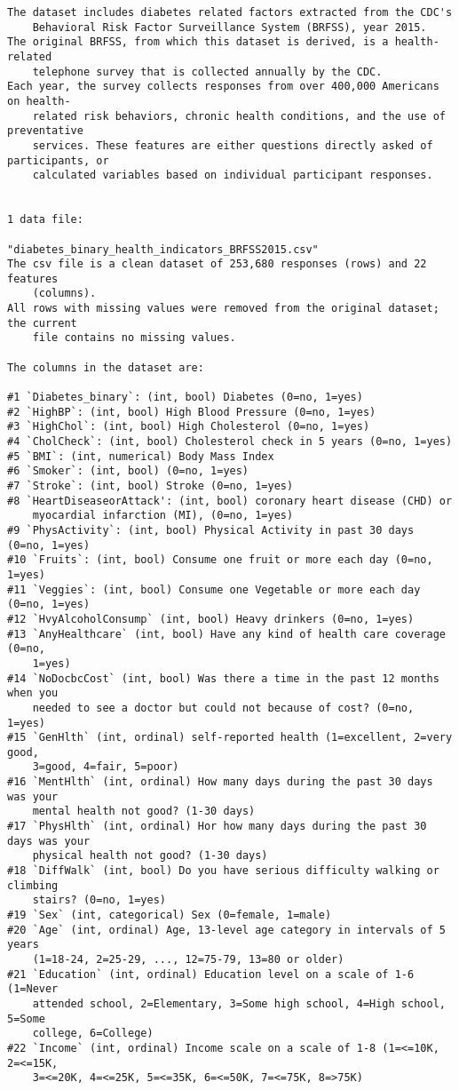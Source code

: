 \documentclass[11pt]{article}
\begin{document}
\begin{footnotesize}
\begin{Verbatim}[tabsize=4]
The dataset includes diabetes related factors extracted from the CDC's
	Behavioral Risk Factor Surveillance System (BRFSS), year 2015.
The original BRFSS, from which this dataset is derived, is a health-related
	telephone survey that is collected annually by the CDC.
Each year, the survey collects responses from over 400,000 Americans on health-
	related risk behaviors, chronic health conditions, and the use of preventative
	services. These features are either questions directly asked of participants, or
	calculated variables based on individual participant responses.


1 data file:

"diabetes_binary_health_indicators_BRFSS2015.csv"
The csv file is a clean dataset of 253,680 responses (rows) and 22 features
	(columns).
All rows with missing values were removed from the original dataset; the current
	file contains no missing values.

The columns in the dataset are:

#1 `Diabetes_binary`: (int, bool) Diabetes (0=no, 1=yes)
#2 `HighBP`: (int, bool) High Blood Pressure (0=no, 1=yes)
#3 `HighChol`: (int, bool) High Cholesterol (0=no, 1=yes)
#4 `CholCheck`: (int, bool) Cholesterol check in 5 years (0=no, 1=yes)
#5 `BMI`: (int, numerical) Body Mass Index
#6 `Smoker`: (int, bool) (0=no, 1=yes)
#7 `Stroke`: (int, bool) Stroke (0=no, 1=yes)
#8 `HeartDiseaseorAttack': (int, bool) coronary heart disease (CHD) or
	myocardial infarction (MI), (0=no, 1=yes)
#9 `PhysActivity`: (int, bool) Physical Activity in past 30 days (0=no, 1=yes)
#10 `Fruits`: (int, bool) Consume one fruit or more each day (0=no, 1=yes)
#11 `Veggies`: (int, bool) Consume one Vegetable or more each day (0=no, 1=yes)
#12 `HvyAlcoholConsump` (int, bool) Heavy drinkers (0=no, 1=yes)
#13 `AnyHealthcare` (int, bool) Have any kind of health care coverage (0=no,
	1=yes)
#14 `NoDocbcCost` (int, bool) Was there a time in the past 12 months when you
	needed to see a doctor but could not because of cost? (0=no, 1=yes)
#15 `GenHlth` (int, ordinal) self-reported health (1=excellent, 2=very good,
	3=good, 4=fair, 5=poor)
#16 `MentHlth` (int, ordinal) How many days during the past 30 days was your
	mental health not good? (1-30 days)
#17 `PhysHlth` (int, ordinal) Hor how many days during the past 30 days was your
	physical health not good? (1-30 days)
#18 `DiffWalk` (int, bool) Do you have serious difficulty walking or climbing
	stairs? (0=no, 1=yes)
#19 `Sex` (int, categorical) Sex (0=female, 1=male)
#20 `Age` (int, ordinal) Age, 13-level age category in intervals of 5 years
	(1=18-24, 2=25-29, ..., 12=75-79, 13=80 or older)
#21 `Education` (int, ordinal) Education level on a scale of 1-6 (1=Never
	attended school, 2=Elementary, 3=Some high school, 4=High school, 5=Some
	college, 6=College)
#22 `Income` (int, ordinal) Income scale on a scale of 1-8 (1=<=10K, 2=<=15K,
	3=<=20K, 4=<=25K, 5=<=35K, 6=<=50K, 7=<=75K, 8=>75K)


\end{Verbatim}
\end{footnotesize}
\end{document}
